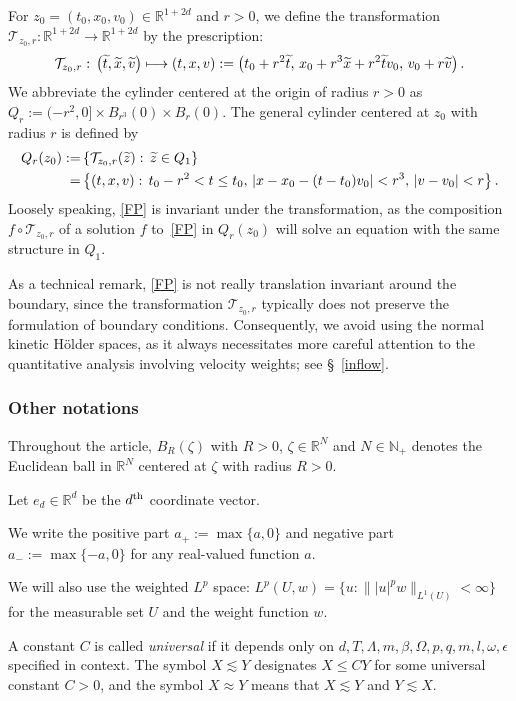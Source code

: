 \documentclass[AHL,Unicode,longabstracts,published]{cedram}
\newcommand*\N {\mathbb{N}}
\newcommand*\R {\mathbb{R}}
\newcommand*\T{\mathcal{T}}
\let\oldtilde\tilde
\renewcommand*{\tilde}[1]{\mathchoice{\widetilde{#1}}{\widetilde{#1}}{\oldtilde{#1}}{\oldtilde{#1}}}
\begin{document}
For $z_0=(t_0,x_0,v_0)\in\R^{1+2d}$ and $r>0$, we define the transformation $\T_{z_0,r}:\R^{1+2d}\rightarrow\R^{1+2d}$ by the prescription:
\begin{align*}
\T_{z_0,r}:\, \left(\tilde{t},\tilde{x},\tilde{v}\right) \longmapsto (t,x,v):=\left(t_0+r^2\tilde{t},\,x_0+r^3\tilde{x}+r^2\tilde{t}v_0,\,v_0+r\tilde{v}\right).
\end{align*}
We abbreviate the cylinder centered at the origin of radius $r>0$ as $Q_r:= (-r^2, 0] \times B_{r^3}(0) \times B_r(0)$. The general cylinder centered at $z_0$ with radius $r$ is defined by
\begin{align*}
Q_r(z_{0}):=&\left\{ \T_{z_0,r}(\tilde{z}): \, \tilde{z}\in Q_1\right\}\\
=&\left\{ (t,x,v): \, t_{0} - r^{2} < t \le t_{0}, \, |x - x_{0} - (t - t_{0})v_{0}| < r^{3},\, |v - v_{0}| < r\right\}.
\end{align*}
Loosely speaking, \eqref{FP} is invariant under the transformation, as the composition $f\circ\T_{z_0,r}$ of a solution $f$ to~\eqref{FP} in $Q_r(z_{0})$ will solve an equation with the same structure in $Q_1$.

As a technical remark, \eqref{FP} is not really translation invariant around the boundary, since the transformation $\T_{z_0,r}$ typically does not preserve the formulation of boundary conditions. Consequently, we avoid using the normal kinetic H\"older spaces, as it always necessitates more careful attention to the quantitative analysis involving velocity weights; see \S~\ref{inflow}.

\subsubsection{Other notations}\label{notations}


Throughout the article, $B_R(\zeta)$ with $R>0$, $\zeta\in\R^N$ and $N\in\N_+$ denotes the Euclidean ball in $\R^N$ centered at $\zeta$ with radius $R>0$.

Let $e_d\in\R^d$ be the $d^{\rm th}$ coordinate vector.

We write the positive part $a_+:=\max\{a,0\}$ and negative part $a_-:=\max\{-a,0\}$ for any real-valued function $a$.

We will also use the weighted $L^p$ space: $L^p(U,w)=\{u:\||u|^pw\|_{L^1(U)}<\infty\}$ for the measurable set $U$ and the weight function $w$.

A constant $C$ is called \emph{universal} if it depends only on $d,T,\Lambda,m,\beta,\Omega,p,q,m,l,\omega,\epsilon$ specified in context. The symbol $X\lesssim Y$ designates $X\le CY$ for some universal constant $C>0$, and the symbol $X\approx Y$ means that $X\lesssim Y$ and $Y\lesssim X$.
\end{document}
